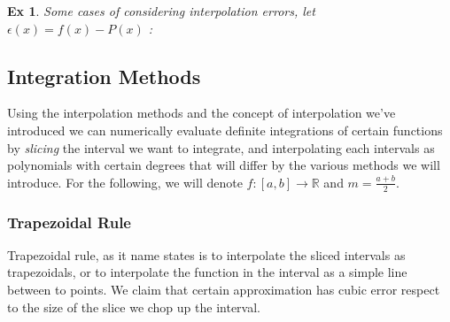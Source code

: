 \documentclass[paper=a4, fontsize=11pt]{scrartcl}
\newtheorem{example}{Ex}
\begin{document}
\begin{example}
Some cases of considering interpolation errors, let $\epsilon(x)=f(x)-P(x)$ :\\
\end{example}

\vspace{0.15in}
\subsection{Integration Methods}
\vspace{0.15in}

Using the interpolation methods and the concept of interpolation we've introduced we can numerically evaluate definite integrations of certain functions by \textit{slicing} the interval we want to integrate, and interpolating each intervals as polynomials with certain degrees that will differ by the various methods we will introduce. For the following, we will denote $f:[a,b]\to\mathbb{R}$ and $m=\frac{a+b}{2}$.

\vspace{0.15in}
\subsubsection{Trapezoidal Rule}
\vspace{0.15in}

Trapezoidal rule, as it name states is to interpolate the sliced intervals as trapezoidals, or to interpolate the function in the interval as a simple line between to points. We claim that certain approximation has cubic error respect to the size of the slice we chop up the interval.\\
\end{document}
